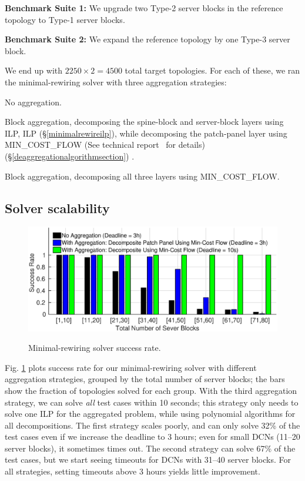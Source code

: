 \documentclass[letterpaper,twocolumn,10pt]{article}
\newcounter{MYenumctr}
\newenvironment{MYenum}{\begin{list}{\arabic{MYenumctr}.}{%
\usecounter{MYenumctr}%
\setlength{\topsep}{0pt plus 0pt minus 0pt}%
\setlength{\itemsep}{0pt plus 0pt minus 0pt}%
\setlength{\parsep}{0pt plus 0pt minus 0pt}%
\setlength{\parskip}{0pt plus 0pt minus 0pt}%
\setlength{\leftmargin}{0.7em}%
\setlength{\listparindent}{1em}%
\setlength{\labelsep}{.25em}%
}}{\end{list}}
\begin{document}
{\bf Benchmark Suite 1:} We upgrade two Type-2 server blocks in the reference topology to Type-1 server blocks.

{\bf Benchmark Suite 2:} We expand the reference topology by one Type-3 server block.

We end up with $2250 \times 2 = 4500$ total target topologies.  For each of these, we ran the minimal-rewiring solver with three aggregation strategies:
\begin{MYenum}
  \item No aggregation.
  \item Block aggregation, decomposing the spine-block and server-block layers using {\ifpaper ILP, \else ILP (\S\ref{minimalrewireilp}), \fi} while decomposing the patch-panel layer using MIN\_COST\_FLOW {\ifpaper (See technical report~\cite{TechnicalReport} for details) \else (\S\ref{deaggregationalgorithmsection}) \fi}.
  \item Block aggregation, decomposing all three layers using  MIN\_COST\_FLOW.
\end{MYenum}

\subsection{Solver scalability}\label{solverrunningtimesection}

\begin{figure}[ht]
  \centering
  \includegraphics[scale=0.3]{incremental_size_success_rate}\\
\vspace{-1ex}
  \caption{Minimal-rewiring solver success rate.}\label{incremental_size_success_rate}
\end{figure}

Fig. \ref{incremental_size_success_rate} plots success rate for our minimal-rewiring solver with different aggregation strategies, grouped by the total number of server blocks; the bars show the fraction of topologies solved for each group.  With the third aggregation strategy, we can solve \emph{all} test cases within 10 seconds; this strategy only needs to solve one ILP for the aggregated problem, while using polynomial algorithms for all decompositions. The first strategy scales poorly, and can only solve 32\% of the test cases even if we increase the deadline to 3 hours; even for small DCNs (11--20 server blocks), it sometimes times out. The second strategy can solve 67\% of the test cases, but we start seeing timeouts for DCNs with 31--40 server blocks.  For all strategies, setting timeouts above 3 hours yields little improvement.
\end{document}
